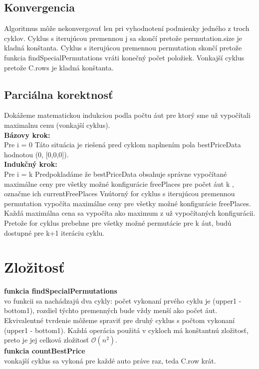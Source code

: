 \documentclass[paper=a4, fontsize=11pt]{scrartcl} %
\numberwithin{equation}{section} %
\numberwithin{figure}{section} %
\numberwithin{table}{section} %
\begin{document}
\subsection*{Konvergencia}
Algoritmus môže nekonvergovať len pri vyhodnotení podmienky jedného z troch cyklov.
Cyklus s iterujúcou premennou j sa skončí pretože permutation.size je kladná konštanta.
Cyklus s iterujúcou premennou permutation skončí pretože funkcia findSpecialPermutations vráti konečný počet položiek.
Vonkajší cyklus pretože C.rows je kladná konštanta.


\subsection*{Parciálna korektnosť}
Dokážeme matematickou indukciou podla počtu áut pre ktorý sme už vypočítali maximalnu cenu (vonkajší cyklus). \ \\

\textbf{Bázovy krok:} \ \\
Pre i = 0
Táto situácia je riešená pred cyklom naplnením pola bestPriceData hodnotou (0, [0,0,0]). \ \\ 

\textbf{Indukčný krok:} \ \\
Pre i = k
Predpokladáme že bestPriceData obsahuje správne vypočítané maximálne ceny pre všetky možné konfigurácie freePlaces pre počet áut k , označme ich currentFreePlaces
Vnútorný for cyklus s iterujúcou premennou permutation vypočíta maximálne ceny pre všetky možné konfigurácie freePlaces. Každá maximálna cena sa vypočíta ako maximum z už vypočítaných konfigurácii.
Pretože for cyklus prebehne pre všetky možné permutácie pre k áut, budú dostupné pre k+1 iteráciu cyklu.

\section{Zložitosť}
\textbf{funkcia findSpecialPermutations} \ \\
vo funkcii sa nachádzajú dva cykly:
počet vykonaní prvého cyklu je (upper1 - bottom1), rozdiel týchto premenných bude vždy menší ako počet áut.
Ekvivalentné tvrdenie môžeme spraviť pre druhý cyklus s počtom vykonaní (upper1 - bottom1).
Každá operácia použitá v cykloch má konštantnú zložitosť, preto je jej celková zložitosť $\mathcal{O}(n^2)$. \ \\

\textbf{funkcia countBestPrice} \ \\
vonkajší cyklus sa vykoná pre každé auto práve raz, teda C.row krát.
\end{document}
